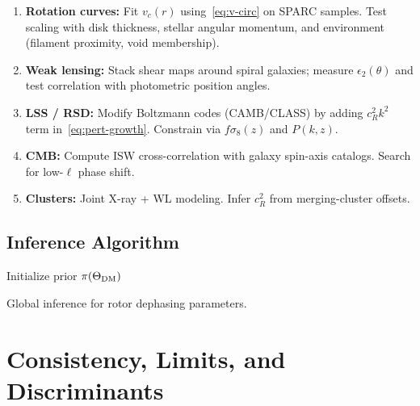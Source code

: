\documentclass[11pt,a4paper]{article}
\numberwithin{equation}{section}
\theoremstyle{plain}
\theoremstyle{definition}
\theoremstyle{remark}
\begin{document}
\begin{enumerate}[leftmargin=*]
  \item \textbf{Rotation curves:} Fit $v_c(r)$ using~\eqref{eq:v-circ} on SPARC samples. Test scaling with disk thickness, stellar angular momentum, and environment (filament proximity, void membership).
  \item \textbf{Weak lensing:} Stack shear maps around spiral galaxies; measure $\epsilon_2(\theta)$ and test correlation with photometric position angles.
  \item \textbf{LSS / RSD:} Modify Boltzmann codes (CAMB/CLASS) by adding $c_R^2 k^2$ term in~\eqref{eq:pert-growth}. Constrain via $f\sigma_8(z)$ and $P(k,z)$.
  \item \textbf{CMB:} Compute ISW cross-correlation with galaxy spin-axis catalogs. Search for low-$\ell$ phase shift.
  \item \textbf{Clusters:} Joint X-ray + WL modeling. Infer $c_R^2$ from merging-cluster offsets.
\end{enumerate}

\subsection{Inference Algorithm}

\begin{algorithm}[H]
\DontPrintSemicolon
{}
Initialize prior $\pi(\Theta_{\rm DM})$\;
\caption{Global inference for rotor dephasing parameters.}
\end{algorithm}

\vspace{1em}

\section{Consistency, Limits, and Discriminants}\label{sec:discriminants}
\end{document}

